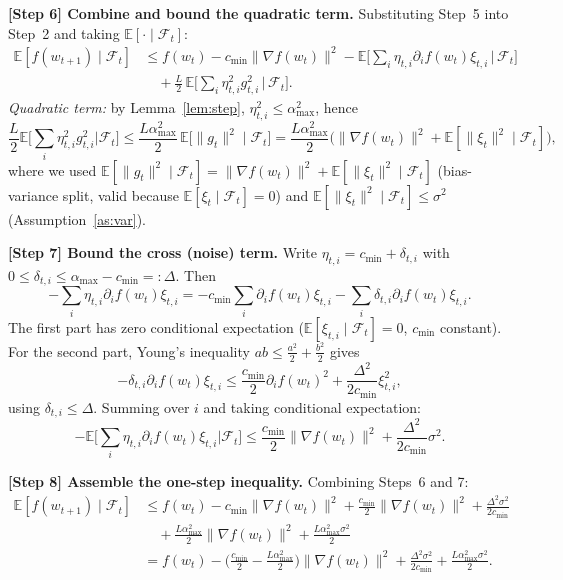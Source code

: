 \documentclass[11pt]{article}
\begin{document}
\noindent\textbf{[Step 6] Combine and bound the quadratic term.}
Substituting Step~5 into Step~2 and taking $\mathbb{E}[\cdot\mid\mathcal F_t]$:
\begin{align*}
\mathbb{E}[f(w_{t+1})\mid\mathcal F_t]
&\le f(w_t)
- c_{\min}\|\nabla f(w_t)\|^2
- \mathbb{E}\!\Big[\sum_i \eta_{t,i}\partial_i f(w_t)\xi_{t,i}\,\Big|\,\mathcal F_t\Big]\\
&\quad
+ \frac{L}{2}\,\mathbb{E}\!\Big[\sum_i \eta_{t,i}^2 g_{t,i}^2\,\Big|\,\mathcal F_t\Big].
\end{align*}
\emph{Quadratic term:} by Lemma~\ref{lem:step},
$\eta_{t,i}^2\le\alpha_{\max}^2$, hence
\[
\frac{L}{2}\mathbb{E}\!\Big[\sum_i \eta_{t,i}^2 g_{t,i}^2\Big|\mathcal F_t\Big]
\le \frac{L\alpha_{\max}^2}{2}\,\mathbb{E}\big[\|g_t\|^2\mid\mathcal F_t\big]
= \frac{L\alpha_{\max}^2}{2}\Big(\|\nabla f(w_t)\|^2+\mathbb E[\|\xi_t\|^2\mid\mathcal F_t]\Big),
\]
where we used $\mathbb E[\|g_t\|^2\mid\mathcal F_t]
=\|\nabla f(w_t)\|^2+\mathbb E[\|\xi_t\|^2\mid\mathcal F_t]$
(bias-variance split, valid because $\mathbb E[\xi_t\mid\mathcal F_t]=0$)
and $\mathbb E[\|\xi_t\|^2\mid\mathcal F_t]\le\sigma^2$
(Assumption~\ref{as:var}).

\noindent\textbf{[Step 7] Bound the cross (noise) term.}
Write $\eta_{t,i}=c_{\min}+\delta_{t,i}$ with
$0\le\delta_{t,i}\le \alpha_{\max}-c_{\min}=:\Delta$. Then
\[
-\sum_i \eta_{t,i}\partial_i f(w_t)\xi_{t,i}
= -c_{\min}\sum_i\partial_i f(w_t)\xi_{t,i}
- \sum_i \delta_{t,i}\partial_i f(w_t)\xi_{t,i}.
\]
The first part has zero conditional expectation
($\mathbb E[\xi_{t,i}\mid\mathcal F_t]=0$, $c_{\min}$ constant). For the
second part, Young's inequality $ab\le \tfrac{a^2}{2}+\tfrac{b^2}{2}$ gives
\[
-\delta_{t,i}\partial_i f(w_t)\xi_{t,i}
\le \frac{c_{\min}}{2}\partial_i f(w_t)^2
+ \frac{\Delta^2}{2c_{\min}}\xi_{t,i}^2 ,
\]
using $\delta_{t,i}\le\Delta$. Summing over $i$ and taking conditional
expectation:
\[
-\mathbb E\Big[\sum_i \eta_{t,i}\partial_i f(w_t)\xi_{t,i}\Big|\mathcal F_t\Big]
\le \frac{c_{\min}}{2}\|\nabla f(w_t)\|^2
+ \frac{\Delta^2}{2c_{\min}}\sigma^2 .
\]

\noindent\textbf{[Step 8] Assemble the one-step inequality.}
Combining Steps~6 and 7:
\begin{align*}
\mathbb{E}[f(w_{t+1})\mid\mathcal F_t]
&\le f(w_t)
- c_{\min}\|\nabla f(w_t)\|^2
+ \frac{c_{\min}}{2}\|\nabla f(w_t)\|^2
+ \frac{\Delta^2\sigma^2}{2c_{\min}}\\
&\quad + \frac{L\alpha_{\max}^2}{2}\|\nabla f(w_t)\|^2
+ \frac{L\alpha_{\max}^2\sigma^2}{2}\\
&= f(w_t)
- \Big(\frac{c_{\min}}{2} - \frac{L\alpha_{\max}^2}{2}\Big)\|\nabla f(w_t)\|^2
+ \frac{\Delta^2\sigma^2}{2c_{\min}}
+ \frac{L\alpha_{\max}^2\sigma^2}{2}.
\end{align*}
\end{document}
